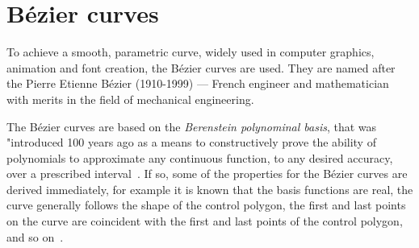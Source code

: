 \section{Bézier curves}\label{sec:bezier-curves}
To achieve a smooth, parametric curve, widely used in computer graphics, animation and font creation, the Bézier curves are used.
They are named after the Pierre Etienne Bézier (1910-1999) --- French engineer and mathematician with merits in the field of mechanical engineering.

The Bézier curves are based on the \textit{Berenstein polynominal basis}, that was "introduced 100 years ago as a means to constructively prove the ability of polynomials to approximate any continuous function, to any desired accuracy, over a prescribed interval~\cite{farouki2012bernstein}.
If so, some of the properties for the Bézier curves are derived immediately, for example it is known that the basis functions are real, the curve generally follows the shape of the control polygon, the first and last points on the curve are coincident with the first and last points of the control polygon, and so on~\cite{bezier-curves}.

